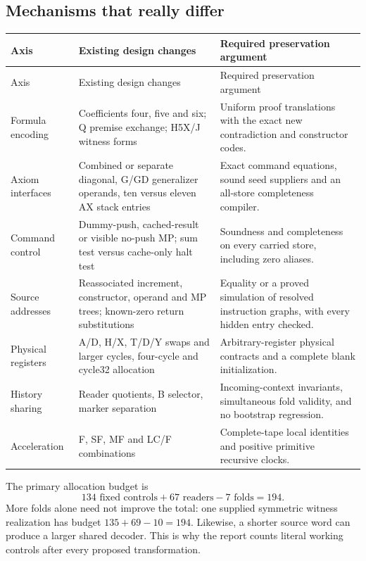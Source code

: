 \documentclass[11pt]{article}
\begin{document}
\subsection{Mechanisms that really differ}
\begin{longtable}{p{33mm}p{53mm}p{60mm}}
\toprule Axis & Existing design changes & Required preservation argument\\\midrule\endfirsthead
\toprule Axis & Existing design changes & Required preservation argument\\\midrule\endhead
\bottomrule\endfoot
Formula encoding & Coefficients four, five and six; Q premise exchange; H5X/J witness forms & Uniform proof translations with the exact new contradiction and constructor codes.\\
Axiom interfaces & Combined or separate diagonal, G/GD generalizer operands, ten versus eleven AX stack entries & Exact command equations, sound seed suppliers and an all-store completeness compiler.\\
Command control & Dummy-push, cached-result or visible no-push MP; sum test versus cache-only halt test & Soundness and completeness on every carried store, including zero aliases.\\
Source addresses & Reassociated increment, constructor, operand and MP trees; known-zero return substitutions & Equality or a proved simulation of resolved instruction graphs, with every hidden entry checked.\\
Physical registers & A/D, H/X, T/D/Y swaps and larger cycles, four-cycle and cycle32 allocation & Arbitrary-register physical contracts and a complete blank initialization.\\
History sharing & Reader quotients, B selector, marker separation & Incoming-context invariants, simultaneous fold validity, and no bootstrap regression.\\
Acceleration & F, SF, MF and LC/F combinations & Complete-tape local identities and positive primitive recursive clocks.\\
\end{longtable}

The primary allocation budget is
\[
               134\text{ fixed controls}+67\text{ readers}-7\text{ folds}=194.
\]
More folds alone need not improve the total: one supplied symmetric witness realization has budget $135+69-10=194$. Likewise, a shorter source word can produce a larger shared decoder. This is why the report counts literal working controls after every proposed transformation.
\end{document}
